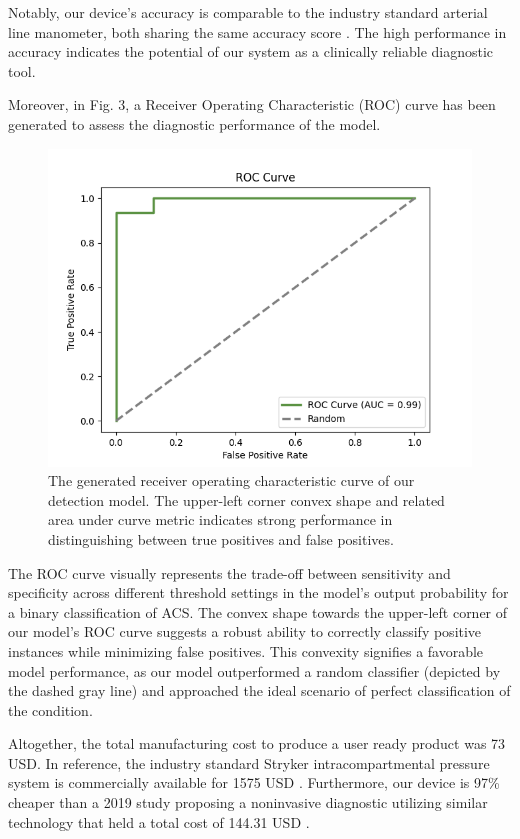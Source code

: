 \documentclass[times, twoside]{zHenriquesLab-StyleBioRxiv}
\begin{document}
Notably, our device's accuracy is comparable to the industry standard arterial line manometer, both sharing the same accuracy score \cite{boody2005accuracy}. The high performance in accuracy indicates the potential of our system as a clinically reliable diagnostic tool.

Moreover, in Fig. 3, a Receiver Operating Characteristic (ROC) curve has been generated to assess the diagnostic performance of the model.

\begin{figure}[H] %
    \centering
    \includegraphics[width=1\linewidth]{ROC_curve.png}
    \caption{The generated receiver operating characteristic curve of our detection model. The upper-left corner convex shape and related area under curve metric indicates strong performance in distinguishing between true positives and false positives.}
    \label{fig:fig4}
\end{figure}

The ROC curve visually represents the trade-off between sensitivity and specificity across different threshold settings in the model’s output probability for a binary classification of ACS. The convex shape towards the upper-left corner of our model’s ROC curve suggests a robust ability to correctly classify positive instances while minimizing false positives. This convexity signifies a favorable model performance, as our model outperformed a random classifier (depicted by the dashed gray line) and approached the ideal scenario of perfect classification of the condition. 

Altogether, the total manufacturing cost to produce a user ready product was 73 USD. In reference, the industry standard Stryker intracompartmental pressure system is commercially available for 1575 USD \cite{ULIASZ2003143}. Furthermore, our device is 97\% cheaper than a 2019 study proposing a noninvasive diagnostic utilizing similar technology that held a total cost of  144.31 USD \cite{ferrari2019sensei}. 
\end{document}

